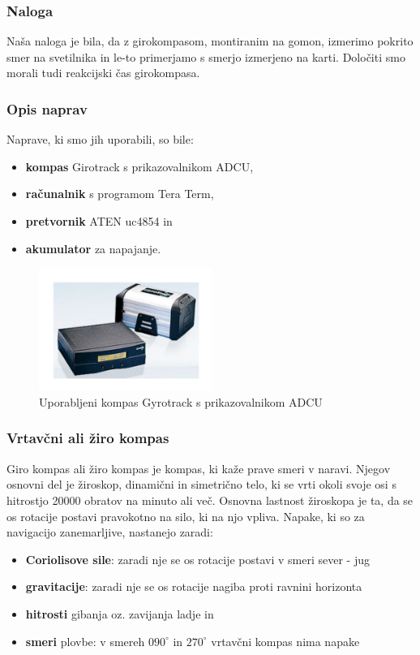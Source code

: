 \subsubsection{Naloga}
Naša naloga je bila, da z girokompasom, montiranim na gomon, izmerimo pokrito smer na svetilnika in le-to primerjamo s smerjo izmerjeno na karti. Določiti smo morali tudi reakcijski čas girokompasa.

\subsubsection{Opis naprav}
Naprave, ki smo jih uporabili, so bile:
\begin{itemize}
	\item \textbf{kompas} Girotrack s prikazovalnikom ADCU, 
	\item \textbf{računalnik} s programom Tera Term, 
	\item \textbf{pretvornik} ATEN uc4854 in 
	\item \textbf{akumulator} za napajanje.
\end{itemize}  

\begin{figure}
	\centering
	\includegraphics[height=4cm]{Gyrotrac_slika}
	\caption{Uporabljeni kompas Gyrotrack s prikazovalnikom ADCU}
	\label{fig:GT}       %
\end{figure}

\subsubsection{Vrtavčni ali žiro kompas}
Giro kompas ali žiro kompas je kompas, ki kaže prave smeri v naravi. Njegov osnovni del je žiroskop, dinamični in simetrično telo, ki se vrti okoli svoje osi s hitrostjo 20000 obratov na minuto ali več. Osnovna lastnost žiroskopa je ta, da se os rotacije postavi pravokotno na silo, ki na njo vpliva. Napake, ki so za navigacijo zanemarljive, nastanejo zaradi:
\begin{itemize}
	\item \textbf{Coriolisove sile}: zaradi nje se os rotacije postavi v smeri sever - jug
	\item \textbf{gravitacije}: zaradi nje se os rotacije nagiba proti ravnini horizonta
	\item \textbf{hitrosti} gibanja oz. zavijanja ladje in
	\item \textbf{smeri} plovbe: v smereh $090^{\circ}$ in $270^{\circ}$ vrtavčni kompas nima napake
\end{itemize}


